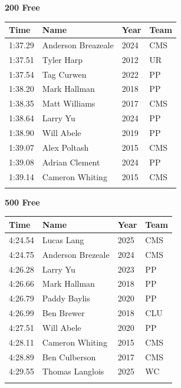 \vspace{1.2em}
\noindent\begin{minipage}[t]{0.98\textwidth}
\centering
\textbf{\textcolor{teamprimary}{200 Free}}\par
\vspace{0.5em}
\centering
\small
\renewcommand{\arraystretch}{1.0}
\setlength{\tabcolsep}{4pt}
\begin{tabular}{@{}p{2.5cm}p{4.5cm}p{1.5cm}p{2.5cm}@{}}
\toprule
\textbf{Time} & \textbf{Name} & \textbf{Year} & \textbf{Team} \\
\midrule
1:37.29 & Anderson Breazeale & 2024 & CMS \\
1:37.51 & Tyler Harp & 2012 & UR \\
1:37.54 & Tag Curwen & 2022 & PP \\
1:38.20 & Mark Hallman & 2018 & PP \\
1:38.35 & Matt Williams & 2017 & CMS \\
1:38.64 & Larry Yu & 2024 & PP \\
1:38.90 & Will Abele & 2019 & PP \\
1:39.07 & Alex Poltash & 2015 & CMS \\
1:39.08 & Adrian Clement & 2024 & PP \\
1:39.14 & Cameron Whiting & 2015 & CMS \\
\bottomrule
\vspace{0.5em}
\end{tabular}
\end{minipage}
\vspace{1.2em}
\noindent\begin{minipage}[t]{0.98\textwidth}
\centering
\textbf{\textcolor{teamprimary}{500 Free}}\par
\vspace{0.5em}
\centering
\small
\renewcommand{\arraystretch}{1.0}
\setlength{\tabcolsep}{4pt}
\begin{tabular}{@{}p{2.5cm}p{4.5cm}p{1.5cm}p{2.5cm}@{}}
\toprule
\textbf{Time} & \textbf{Name} & \textbf{Year} & \textbf{Team} \\
\midrule
4:24.54 & Lucas Lang & 2025 & CMS \\
4:24.75 & Anderson Brezeale & 2024 & CMS \\
4:26.28 & Larry Yu & 2023 & PP \\
4:26.66 & Mark Hallman & 2018 & PP \\
4:26.79 & Paddy Baylis & 2020 & PP \\
4:26.99 & Ben Brewer & 2018 & CLU \\
4:27.51 & Will Abele & 2020 & PP \\
4:28.11 & Cameron Whiting & 2015 & CMS \\
4:28.89 & Ben Culberson & 2017 & CMS \\
4:29.55 & Thomas Langlois & 2025 & WC \\
\bottomrule
\vspace{0.5em}
\end{tabular}
\end{minipage}
